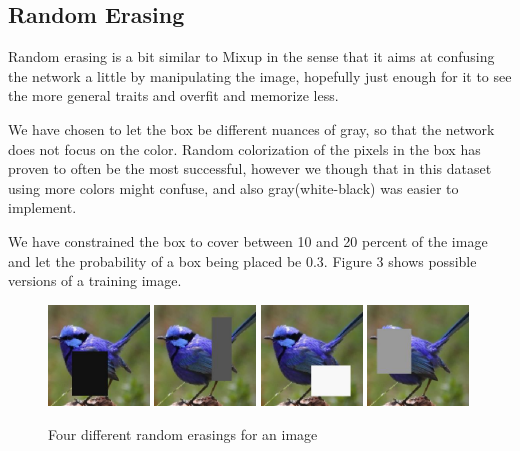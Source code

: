 \documentclass{article}
\begin{document}
\subsection{Random Erasing}

Random erasing is a bit similar to Mixup in the sense that it aims at confusing the network a little by manipulating the image, hopefully just enough for it to see the more general traits and overfit and memorize less.

We have chosen to let the box be different nuances of gray, so that the network does not focus on the color. Random colorization of the pixels in the box has proven to often be the most successful, however we though that in this dataset using more colors might confuse, and also gray(white-black) was easier to implement.

We have constrained the box to cover between 10 and 20 percent of the image and let the probability of a box being placed be 0.3. Figure 3 shows possible versions of a training image.

\begin{figure}[h]
	\includegraphics[width=0.24\textwidth]{re1.jpeg}
	\includegraphics[width=0.24\textwidth]{re2.jpeg}
	\includegraphics[width=0.24\textwidth]{re3.jpeg}
	\includegraphics[width=0.24\textwidth]{re4.jpeg}
	\caption{Four different random erasings for an image}
\end{figure}
\end{document}
